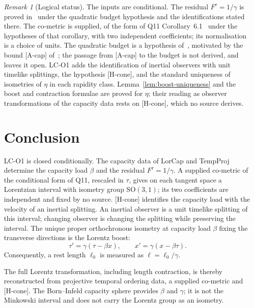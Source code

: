 \documentclass[12pt,a4paper]{article}
\theoremstyle{remark}
\newtheorem{remark}[theorem]{Remark}
\theoremstyle{definition}
\newcommand{\SO}{\mathrm{SO}}
\begin{document}
    \begin{remark}[Logical status]
      \label{rem:logical-status}
      The inputs are conditional.
      The residual $F^\tau = 1/\gamma$ is proved in~\cite{Beau2026n,Beau2026tp} under the quadratic budget
      hypothesis and the identifications stated there.
      The co-metric is supplied, of the form of Q11 Corollary~6.1~\cite{Beau2026q11} under the hypotheses of that
      corollary, with two independent coefficients; its normalisation is a choice of units.
      The quadratic budget is a hypothesis of~\cite{Beau2026n}, motivated by the bound [A-cap] of~\cite{Beau2026c}; the
      passage from [A-cap] to the budget is not derived, and~\cite{Beau2026c} leaves it open.
      LC-O1 adds the identification of inertial observers with unit timelike splittings, the hypothesis [H-cone],
      and the standard uniqueness of isometries of $\eta$ in each rapidity class.
      Lemma~\ref{lem:boost-uniqueness} and the boost and contraction formulae are proved for $\eta$; their reading
      as observer transformations of the capacity data rests on [H-cone], which no source derives.
    \end{remark}

  \section{Conclusion}
    \label{sec:conclusion}

    LC-O1 is closed conditionally.
    The capacity data of LorCap and TempProj determine the capacity load $\beta$ and the residual
    $F^\tau = 1/\gamma$.
    A supplied co-metric of the conditional form of Q11, rescaled in $\tau$, gives on each tangent space a Lorentzian
    interval with isometry group $\SO(3,1)$; its two coefficients are independent and fixed by no source.
    [H-cone] identifies the capacity load with the velocity of an inertial splitting.
    An inertial observer is a unit timelike splitting of this interval; changing observer is
    changing the splitting while preserving the interval.
    The unique proper orthochronous isometry at capacity load $\beta$ fixing the transverse directions is the Lorentz
    boost:
    \[
      \tau' = \gamma(\tau - \beta x), \qquad
      x'   = \gamma(x  - \beta\tau).
    \]
    Consequently, a rest length $\ell_0$ is measured as $\ell = \ell_0/\gamma$.

    The full Lorentz transformation, including length contraction, is thereby reconstructed
    from projective temporal ordering data, a supplied co-metric and [H-cone].
    The Born--Infeld capacity sphere provides $\beta$ and $\gamma$;
    it is not the Minkowski interval and does not carry the Lorentz group as an isometry.

    \newpage
    
    
\end{document}
